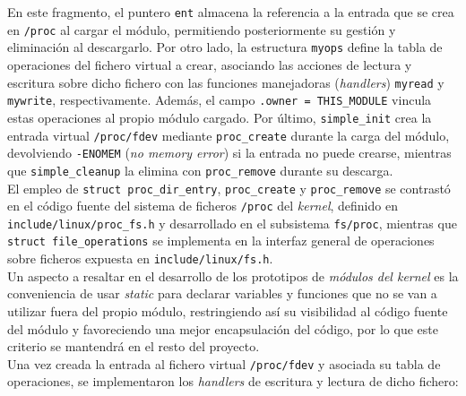 En este fragmento, el puntero \verb|ent| almacena la referencia a la entrada que se crea en \texttt{/proc} al cargar el módulo, permitiendo posteriormente su gestión y eliminación al descargarlo.
Por otro lado, la estructura \verb|myops| define la tabla de operaciones del fichero virtual a crear, asociando las acciones de lectura y escritura sobre dicho fichero con las funciones manejadoras (\textit{handlers}) \verb|myread| y \verb|mywrite|, respectivamente.
Además, el campo \verb|.owner = THIS_MODULE| vincula estas operaciones al propio módulo cargado.
Por último, \verb|simple_init| crea la entrada virtual \texttt{/proc/fdev} mediante \verb|proc_create| durante la carga del módulo, devolviendo \texttt{-ENOMEM} (\textit{no memory error}) si la entrada no puede crearse, mientras que \verb|simple_cleanup| la elimina con \verb|proc_remove| durante su descarga.\\

El empleo de \verb|struct proc_dir_entry|, \verb|proc_create| y \verb|proc_remove| se contrastó en el código fuente del sistema de ficheros \texttt{/proc} del \textit{kernel}, definido en \texttt{include/linux/proc\_fs.h} y desarrollado en el subsistema \texttt{fs/proc}, mientras que \verb|struct file_operations| se implementa en la interfaz general de operaciones sobre ficheros expuesta en \texttt{include/linux/fs.h}.\\

Un aspecto a resaltar en el desarrollo de los prototipos de \textit{módulos del kernel} es la conveniencia de usar \textit{static} para declarar variables y funciones que no se van a utilizar fuera del propio módulo, restringiendo así su visibilidad al código fuente del módulo y favoreciendo una mejor encapsulación del código, por lo que este criterio se mantendrá en el resto del proyecto.\\

Una vez creada la entrada al fichero virtual \texttt{/proc/fdev} y asociada su tabla de operaciones, se implementaron los \textit{handlers} de escritura y lectura de dicho fichero:

